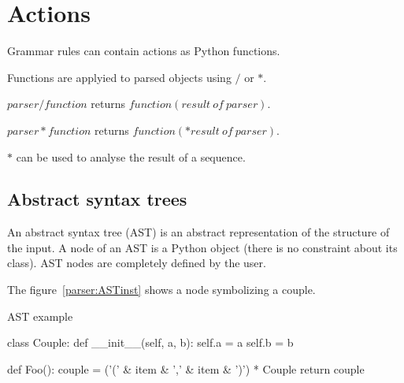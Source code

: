 \section{Actions}

Grammar rules can contain actions as Python functions.

Functions are applyied to parsed objects using $/$ or $*$.

$parser / function$ returns $function(result~of~parser)$.

$parser * function$ returns $function(*result~of~parser)$.

$*$ can be used to analyse the result of a sequence.

\subsection{Abstract syntax trees}                              \label{parser:AST}

An abstract syntax tree (AST) is an abstract representation of the structure of the input.
A node of an AST is a Python object (there is no constraint about its class).
AST nodes are completely defined by the user.

The figure~\ref{parser:ASTinst} shows a node symbolizing a couple.

\begin{code}
\caption{AST example}                                           \label{parser:ASTinst}
\begin{verbatimtab}[4]

class Couple:
    def __init__(self, a, b):
        self.a = a
        self.b = b

def Foo():
    couple = ('(' & item & ',' & item & ')') * Couple
    return couple
\end{verbatimtab}
\end{code}

